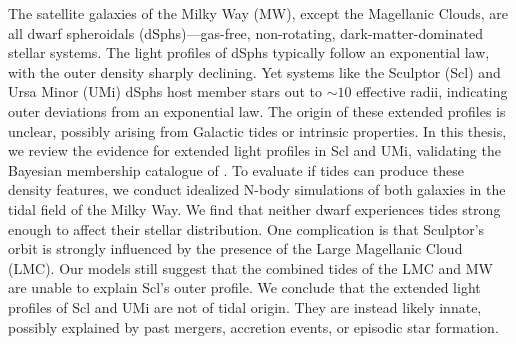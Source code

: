 The satellite galaxies of the Milky Way (MW), except the Magellanic
Clouds, are all dwarf spheroidals (dSphs)---gas-free, non-rotating,
dark-matter-dominated stellar systems. The light profiles of dSphs
typically follow an exponential law, with the outer density sharply
declining. Yet systems like the Sculptor (Scl) and Ursa Minor (UMi)
dSphs host member stars out to \(\sim10\) effective radii, indicating
outer deviations from an exponential law. The origin of these extended
profiles is unclear, possibly arising from Galactic tides or intrinsic
properties. In this thesis, we review the evidence for extended light
profiles in Scl and UMi, validating the Bayesian membership catalogue of
\citet{jensen+2024}. To evaluate if tides can produce these density
features, we conduct idealized N-body simulations of both galaxies in
the tidal field of the Milky Way. We find that neither dwarf experiences
tides strong enough to affect their stellar distribution. One
complication is that Sculptor's orbit is strongly influenced by the
presence of the Large Magellanic Cloud (LMC). Our models still suggest
that the combined tides of the LMC and MW are unable to explain Scl's
outer profile. We conclude that the extended light profiles of Scl and
UMi are not of tidal origin. They are instead likely innate, possibly
explained by past mergers, accretion events, or episodic star formation.
